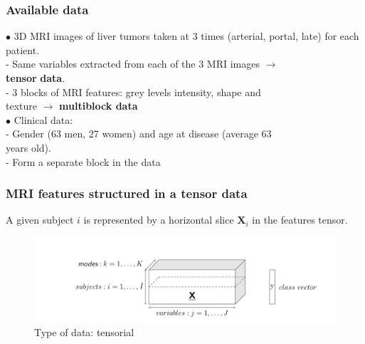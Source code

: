\documentclass{beamer}
\begin{document}
\begin{frame}
    \frametitle{Available data}

    $\bullet$ 3D MRI images of liver tumors taken at 3 times (arterial, portal, late) for each patient.\\[5 pt]
    \hspace{10 pt} - Same variables extracted from each of the 3 MRI images $\rightarrow$\\
    \hspace{10 pt} \textbf{tensor} \textbf{data}. \\
    \hspace{10 pt} - 3 blocks of MRI features: grey levels intensity, shape and\\
    \hspace{12 pt} texture $\rightarrow$ \textbf{multiblock data}\\[15 pt]

    $\bullet$ Clinical data:\\[5 pt]
    \hspace{10 pt} - Gender (63 men, 27 women) and age at disease (average $63$\\
    \hspace{12 pt} years old).\\
    \hspace{10 pt} - Form a separate block in the data



    
\end{frame}




\begin{frame}
    \frametitle{MRI features structured in a tensor data}
A given subject $i$ is represented by a horizontal slice $\mathbf{X}_i$ in the features tensor. 
    \begin{figure}
        \centering
        \includegraphics[scale = 0.23]{images/tensor_mode.png}
        \caption{Type of data: tensorial}
    \end{figure}

\end{frame}
\end{document}

